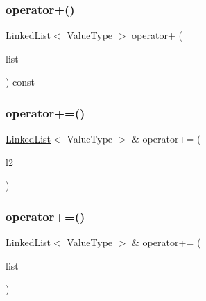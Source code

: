 \subsubsection{\texorpdfstring{operator+()}{operator+()}\hspace{0.1cm}{\footnotesize\ttfamily [2/2]}}
{\footnotesize\ttfamily \mbox{\hyperlink{classLinkedList}{Linked\+List}}$<$ Value\+Type $>$ operator+ (\begin{DoxyParamCaption}\item[{std\+::initializer\+\_\+list$<$ Value\+Type $>$}]{list }\end{DoxyParamCaption}) const}

\mbox{\label{classLinkedList_ae07506d03c2a077c0ade134416371c78}} 
\subsubsection{\texorpdfstring{operator+=()}{operator+=()}\hspace{0.1cm}{\footnotesize\ttfamily [1/3]}}
{\footnotesize\ttfamily \mbox{\hyperlink{classLinkedList}{Linked\+List}}$<$ Value\+Type $>$ \& operator+= (\begin{DoxyParamCaption}\item[{const \mbox{\hyperlink{classLinkedList}{Linked\+List}}$<$ Value\+Type $>$ \&}]{l2 }\end{DoxyParamCaption})}

\mbox{\label{classLinkedList_a7c08c1a4983616294a10bbbf43d3f8df}} 
\subsubsection{\texorpdfstring{operator+=()}{operator+=()}\hspace{0.1cm}{\footnotesize\ttfamily [2/3]}}
{\footnotesize\ttfamily \mbox{\hyperlink{classLinkedList}{Linked\+List}}$<$ Value\+Type $>$ \& operator+= (\begin{DoxyParamCaption}\item[{std\+::initializer\+\_\+list$<$ Value\+Type $>$}]{list }\end{DoxyParamCaption})}

\mbox{\label{classLinkedList_a032d4f974bb2083db2bab6a4e8e6f248}} 
